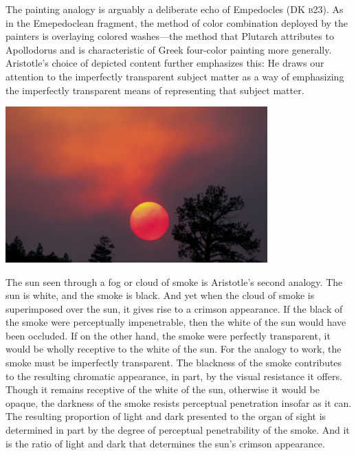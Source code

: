 The painting analogy is arguably a deliberate echo of Empedocles (DK \textsc{b}23). As in the Emepedoclean fragment, the method of color combination deployed by the painters is overlaying colored washes---the method that Plutarch attributes to Apollodorus and is characteristic of Greek four-color painting more generally. Aristotle's choice of depicted content further emphasizes this: He draws our attention to the imperfectly transparent subject matter as a way of emphasizing the imperfectly transparent means of representing that subject matter. \change

\begin{frame}
	\begin{center}
		\includegraphics[height=6cm]{../../graphics/red_sun.jpg}
	\end{center}
\end{frame}

The sun seen through a fog or cloud of smoke is Aristotle's second analogy. The sun is white, and the smoke is black. And yet when the cloud of smoke is superimposed over the sun, it gives rise to a crimson appearance. If the black of the smoke were perceptually impenetrable, then the white of the sun would have been occluded. If on the other hand, the smoke were perfectly transparent, it would be wholly receptive to the white of the sun. For the analogy to work, the smoke must be imperfectly transparent. The blackness of the smoke contributes to the resulting chromatic appearance, in part, by the visual resistance it offers. Though it remains receptive of the white of the sun, otherwise it would be opaque, the darkness of the smoke resists perceptual penetration insofar as it can. The resulting proportion of light and dark presented to the organ of sight is determined in part by the degree of perceptual penetrability of the smoke. And it is the ratio of light and dark that determines the sun's crimson appearance.

